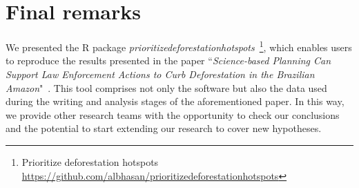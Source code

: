 \documentclass[12pt]{article}
\begin{document}





\section{Final remarks}

We presented the \textsf{R} package \textit{prioritizedeforestationhotspots}~\footnote{Prioritize deforestation hotspots \url{https://github.com/albhasan/prioritizedeforestationhotspots}}, which enables users to reproduce the results presented in the paper ``\textit{Science-based Planning Can Support Law Enforcement Actions to Curb Deforestation in the Brazilian Amazon}"~\cite{mataveli2022,mataveli2023}.
This tool comprises not only the software but also the data used during the writing and analysis stages of the aforementioned paper.
In this way, we provide other research teams with the opportunity to check our conclusions and the potential to start extending our research to cover new hypotheses.


\FloatBarrier



\end{document}
